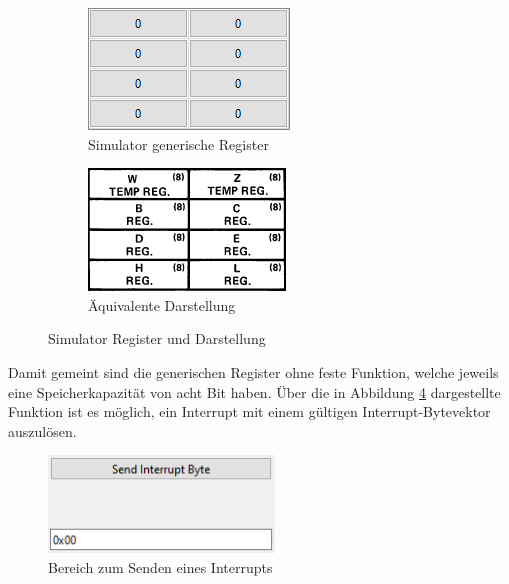 \documentclass[12pt]{article}
\newcommand{\imgSpaceBefore}{\vspace{10pt}}
\begin{document}
\begin{figure}[h]
\centering
\begin{subfigure}{.5\textwidth}
  \centering
  \includegraphics[width=.7\linewidth]{bilder/GenericRegister_sim}
  \caption{Simulator generische Register}
  \label{fig:GenReg_s}
\end{subfigure}%
\begin{subfigure}{.5\textwidth}
  \centering
  \includegraphics[width=.7\linewidth]{bilder/GenericRegister_pic}
  \caption{Äquivalente Darstellung}
  \label{fig:GenReg_p}
\end{subfigure}
\caption{Simulator Register und Darstellung}
\label{fig:GenReg}
\end{figure}

\noindent
Damit gemeint sind die generischen Register ohne feste Funktion, welche jeweils eine Speicherkapazität von acht Bit haben. Über die in Abbildung \ref{fig:Interrupt} dargestellte Funktion ist es möglich, ein Interrupt mit einem gültigen Interrupt-Bytevektor auszulösen.\imgSpaceBefore

\begin{figure}[h]
\centering
\includegraphics[width=6cm]{bilder/Interrupt}
\caption{Bereich zum Senden eines Interrupts}
\label{fig:Interrupt}
\end{figure}
\end{document}
